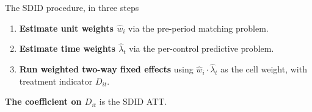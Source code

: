 \documentclass[aspectratio=169,11pt]{beamer}
\begin{document}
\begin{frame}{The SDID procedure, in three steps}
\vspace{0.7em}
\begin{enumerate}
  \item \textbf{Estimate unit weights $\widehat{w}_i$} via the pre-period matching problem.
  \vspace{0.3em}
  \item \textbf{Estimate time weights $\widehat{\lambda}_t$} via the per-control predictive problem.
  \vspace{0.3em}
  \item \textbf{Run weighted two-way fixed effects} using $\widehat{w}_i \cdot \widehat{\lambda}_t$ as the cell weight, with treatment indicator $D_{it}$.
\end{enumerate}

\vspace{0.7em}
\textbf{The coefficient on $D_{it}$} is the SDID ATT.

\vspace{0.6em}
\end{frame}

\end{document}
